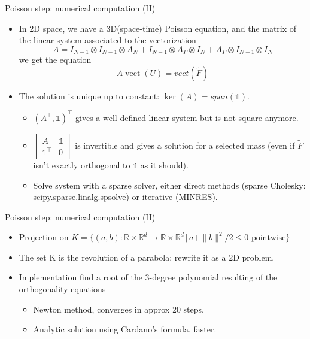 \documentclass{beamer}
\DeclareMathOperator*{\vect}{vect}
\newcommand{\R}{\mathbb{R}}
\newcommand{\un}{\mathds{1}}
\begin{document}
\begin{frame}{Poisson step: numerical computation (II)}
    \begin{itemize}
    \item 
    In 2D space, we have a 3D(space-time) Poisson equation, and the matrix of the linear system associated to the vectorization
    $$ A = I_{N-1}\otimes I_{N-1}\otimes A_N 
    + I_{N-1}\otimes A_P\otimes I_N  
    + A_P\otimes I_{N-1}\otimes I_N$$
    we get the equation
    $$ A\vect(U) = vect(\tilde{F})   $$
    \item 
    The solution is unique up to constant: $\ker(A) = span(\un)$.
    \begin{itemize}
        \item $(A^\top,\un)^\top$ gives a well defined linear system but is not square anymore.
        \item $
        \begin{bmatrix}
            A & \un \\
            \un^\top & 0  
        \end{bmatrix}  $
         is invertible and gives a solution for a selected mass (even if $\tilde{F}$ isn't exactly orthogonal to $\un$ as it should).
         \item Solve system with a sparse solver, either direct methods (sparse Cholesky: scipy.sparse.linalg.spsolve) or iterative (MINRES).
    \end{itemize}
    \end{itemize}
    \end{frame}

\begin{frame}{Poisson step: numerical computation (II)}
    \begin{itemize}
    \item Projection on $K=\bigl\{(a,b):\R\times\R^d\to\R\times\R^d \,\big|\, a + \|b\|^2/2\leq0 \text{ pointwise}\bigl\}$
    \item The set K is the revolution of a parabola: rewrite it as a 2D problem.
    \item Implementation find a root of the 3-degree polynomial resulting of the orthogonality equations
    \begin{itemize}
        \item Newton method, converges in approx 20 steps.
        \item Analytic solution using Cardano's formula, faster.
    \end{itemize}
    \end{itemize}
\end{frame}
\end{document}
